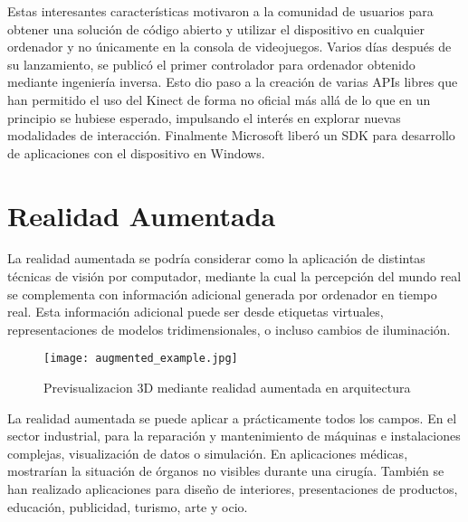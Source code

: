 Estas interesantes características motivaron a la comunidad de usuarios para obtener una solución de código abierto y utilizar el dispositivo en cualquier ordenador y no únicamente en la consola de videojuegos. Varios días después de su lanzamiento, se publicó el primer controlador para ordenador obtenido mediante ingeniería inversa. Esto dio paso a la creación de varias APIs libres que han permitido el uso del Kinect de forma no oficial más allá de lo que en un principio se hubiese esperado, impulsando el interés en explorar nuevas modalidades de interacción. Finalmente Microsoft liberó un \acs{SDK} para desarrollo de aplicaciones con el dispositivo en Windows. 

\section{Realidad Aumentada}
La realidad aumentada se podría considerar como la aplicación de distintas técnicas de visión por computador, mediante la cual la percepción del mundo real se complementa con información adicional generada por ordenador en tiempo real. Esta información adicional puede ser desde etiquetas virtuales, representaciones de modelos tridimensionales, o incluso cambios de iluminación. 

\begin{figure} 
  \centering
  \texttt{[image: augmented\_example.jpg]}
  \caption{Previsualizacion 3D mediante realidad aumentada en arquitectura}
  \label{fig:ar_example}
\end{figure} 


La realidad aumentada se puede aplicar a prácticamente todos los campos. En el sector industrial, para la reparación y mantenimiento de máquinas e instalaciones complejas, visualización de datos o simulación.  En aplicaciones médicas, mostrarían la situación de órganos no visibles durante una cirugía. También se han realizado aplicaciones para diseño de interiores, presentaciones de productos, educación, publicidad, turismo, arte y ocio. 


